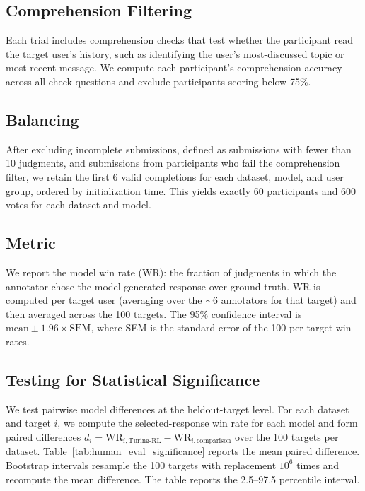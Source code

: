 \documentclass[11pt]{article}
\begin{document}
\subsection{Comprehension Filtering}
Each trial includes comprehension checks that test whether the participant read the target user's history, such as identifying the user's most-discussed topic or most recent message. We compute each participant's comprehension accuracy across all check questions and exclude participants scoring below 75\%. 

\subsection{Balancing}
After excluding incomplete submissions, defined as submissions with fewer than 10 judgments, and submissions from participants who fail the comprehension filter, we retain the first 6 valid completions for each dataset, model, and user group, ordered by initialization time. This yields exactly 60 participants and 600 votes for each dataset and model. 

\subsection{Metric}
We report the model win rate (WR): the fraction of judgments in which the annotator chose the model-generated response over ground truth. WR is computed per target user (averaging over the ${\sim}6$ annotators for that target) and then averaged across the 100 targets. The 95\% confidence interval is $\text{mean} \pm 1.96 \times \text{SEM}$, where SEM is the standard error of the 100 per-target win rates.

\subsection{Testing for Statistical Significance}
\label{app:human-eval-significance}
We test pairwise model differences at the heldout-target level. For each dataset and target $i$, we compute the selected-response win rate for each model and form paired differences $d_i = \text{WR}_{i,\text{Turing-RL}} - \text{WR}_{i,\text{comparison}}$ over the 100 targets per dataset. Table~\ref{tab:human_eval_significance} reports the mean paired difference. Bootstrap intervals resample the 100 targets with replacement $10^6$ times and recompute the mean difference. The table reports the 2.5--97.5 percentile interval. 
\end{document}
